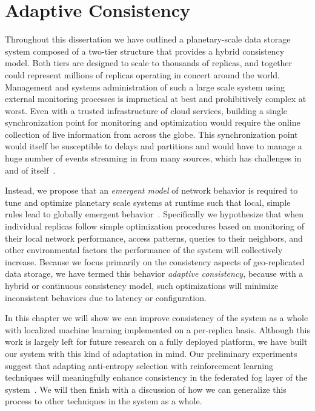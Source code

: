 
\renewcommand{\thechapter}{6}

\chapter{Adaptive Consistency}
\label{ch:adaptive_consistency}

Throughout this dissertation we have outlined a planetary-scale data storage system composed of a two-tier structure that provides a hybrid consistency model.
Both tiers are designed to scale to thousands of replicas, and together could represent millions of replicas operating in concert around the world.
Management and systems administration of such a large scale system using external monitoring processes is impractical at best and prohibitively complex at worst.
Even with a trusted infrastructure of cloud services, building a single synchronization point for monitoring and optimization would require the online collection of live information from across the globe.
This synchronization point would itself be susceptible to delays and partitions and would have to manage a huge number of events streaming in from many sources, which has challenges in and of itself~\cite{spark_streaming}.

Instead, we propose that an \emph{emergent model} of network behavior is required to tune and optimize planetary scale systems at runtime such that local, simple rules lead to globally emergent behavior~\cite{bengfort_evolutionary_2014}.
Specifically we hypothesize that when individual replicas follow simple optimization procedures based on monitoring of their local network performance, access patterns, queries to their neighbors, and other environmental factors the performance of the system will collectively increase.
Because we focus primarily on the consistency aspects of geo-replicated data storage, we have termed this behavior \emph{adaptive consistency}, because with a hybrid or continuous consistency model, such optimizations will minimize inconsistent behaviors due to latency or configuration.

In this chapter we will show we can improve consistency of the system as a whole with localized machine learning implemented on a per-replica basis.
Although this work is largely left for future research on a fully deployed platform, we have built our system with this kind of adaptation in mind.
Our preliminary experiments suggest that adapting anti-entropy selection with reinforcement learning techniques will meaningfully enhance consistency in the federated fog layer of the system~\cite{bengfort_anti-entropy_2018}.
We will then finish with a discussion of how we can generalize this process to other techniques in the system as a whole.

